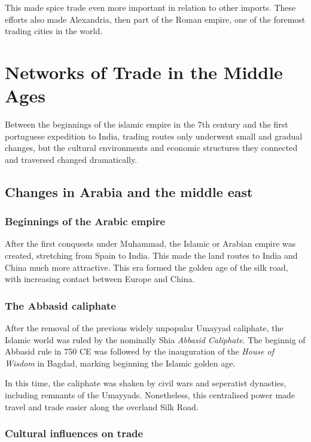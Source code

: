 \documentclass[11pt, a4paper, headings=standardclasses]{scrartcl}
\begin{document}
This made spice trade even more important in relation to other imports.\autocite{SilkRome, Rome} These efforts also made Alexandria, then part of the Roman empire, one of the foremost trading cities in the world.\autocite{SpiceTrade}
\section{Networks of Trade in the Middle Ages}

Between the beginnings of the islamic empire in the 7th century and the first portuguese expedition to India, trading routes only underwent small and gradual changes, but the cultural environments and economic structures they connected and traversed changed dramatically.

\subsection{Changes in Arabia and the middle east}

\subsubsection{Beginnings of the Arabic empire}
After the first conquests under Muhammad, the Islamic or Arabian empire was created, stretching from Spain to India\autocite[Section \textit{Achievements}]{Umayyad}. This made the land routes to India and China much more attractive. This era formed the golden age of the silk road, with increasing contact between Europe and China.

\subsubsection{The Abbasid caliphate}

After the removal of the previous widely unpopular\autocite{Umayyad} Umayyad caliphate, the Islamic world was ruled by the nominally Shia \emph{Abbasid Caliphate}. The beginnig of Abbasid rule in 750 CE was followed by the inauguration of the \emph{House of Wisdom} in Bagdad, marking beginning the Islamic golden age.\autocite{Abbasid}

In this time, the caliphate was shaken by civil wars and seperatist dynasties, including remnants of the Umayyads.\autocite[Section \textit{End}]{Umayyad} Nonetheless, this centralised power made travel and trade easier along the overland Silk Road.

\subsubsection{Cultural influences on trade}
\end{document}
